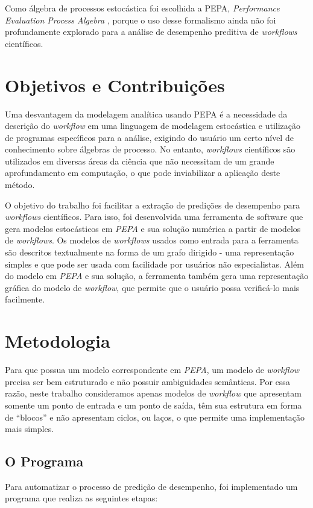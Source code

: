 \documentclass[a4paper,11pt]{article}
\begin{document}
  	Como álgebra de processos estocástica foi escolhida a PEPA, \emph{Performance Evaluation Process Algebra} \cite{web:pepa}, porque o uso desse formalismo ainda não foi profundamente explorado para a análise de desempenho preditiva de \emph{workflows} científicos.
  	
  \section{Objetivos e Contribuiç\~oes}

  	Uma desvantagem da modelagem analítica usando PEPA é a necessidade da descrição do \emph{workflow} em uma linguagem de modelagem estocástica e utilização de programas específicos para a análise, exigindo do usuário um certo nível de conhecimento sobre álgebras de processo. No entanto, \emph{workflows} científicos são utilizados em diversas áreas da ciência que não necessitam de um grande aprofundamento em computação, o que pode inviabilizar a aplicação deste método. 

    O objetivo do trabalho foi facilitar a extração de prediç\~oes de desempenho para \emph{workflows} cient\'ificos. Para isso, foi desenvolvida uma ferramenta de software que gera modelos estoc\'asticos em \emph{PEPA} e sua soluç\~ao num\'erica a partir de modelos de \emph{workflows}. Os modelos de \emph{workflows} usados como entrada para a ferramenta s\~ao descritos textualmente na forma de um grafo dirigido - uma representação simples e que pode ser usada com facilidade por usu\'arios n\~ao especialistas. Al\'em do modelo em \emph{PEPA} e sua soluç\~ao, a ferramenta tamb\'em gera uma representaç\~ao gr\'afica do modelo de \emph{workflow}, que permite que o usu\'ario possa verific\'a-lo mais facilmente.

  \newpage
  \section{Metodologia}

  	Para que possua um modelo correspondente em \emph{PEPA}, um modelo de \emph{workflow} precisa ser bem estruturado e n\~ao possuir ambiguidades sem\^anticas. Por essa raz\~ao, neste trabalho consideramos apenas modelos de \emph{workflow} que apresentam somente um ponto de entrada e um ponto de saída, têm sua estrutura em forma de ``blocos''  e não apresentam ciclos, ou laços, o que permite uma implementação mais simples.


  	\subsection{O Programa}
  		Para automatizar o processo de predição de desempenho, foi implementado um programa que realiza as seguintes etapas:
\end{document}
